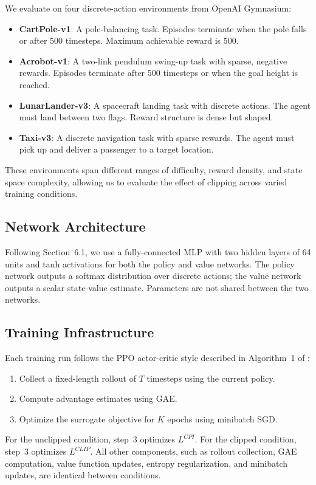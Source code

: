 \documentclass{article}
\begin{document}
We evaluate on four discrete-action environments from OpenAI Gymnasium:
\begin{itemize}
    \item \textbf{CartPole-v1}: A pole-balancing task. Episodes terminate when the pole falls or after 500 timesteps. Maximum achievable reward is 500.
    \item \textbf{Acrobot-v1}: A two-link pendulum swing-up task with sparse, negative rewards. Episodes terminate after 500 timesteps or when the goal height is reached.
    \item \textbf{LunarLander-v3}: A spacecraft landing task with discrete actions. The agent must land between two flags. Reward structure is dense but shaped.
    \item \textbf{Taxi-v3}: A discrete navigation task with sparse rewards. The agent must pick up and deliver a passenger to a target location.
\end{itemize}
These environments span different ranges of difficulty, reward density, and state space complexity, allowing us to evaluate the effect of clipping across varied training conditions.

\subsection{Network Architecture}

Following \citet{schulman2017ppo} Section~6.1, we use a fully-connected MLP with two hidden layers of 64 units and tanh activations for both the policy and value networks. The policy network outputs a softmax distribution over discrete actions; the value network outputs a scalar state-value estimate. Parameters are not shared between the two networks.

\subsection{Training Infrastructure}

Each training run follows the PPO actor-critic style described in Algorithm~1 of \citet{schulman2017ppo}:
\begin{enumerate}
    \item Collect a fixed-length rollout of $T$ timesteps using the current policy.
    \item Compute advantage estimates using GAE.
    \item Optimize the surrogate objective for $K$ epochs using minibatch SGD.
\end{enumerate}
For the unclipped condition, step~3 optimizes $L^{CPI}$. For the clipped condition, step~3 optimizes $L^{CLIP}$. All other components, such as rollout collection, GAE computation, value function updates, entropy regularization, and minibatch updates, are identical between conditions.
\end{document}
